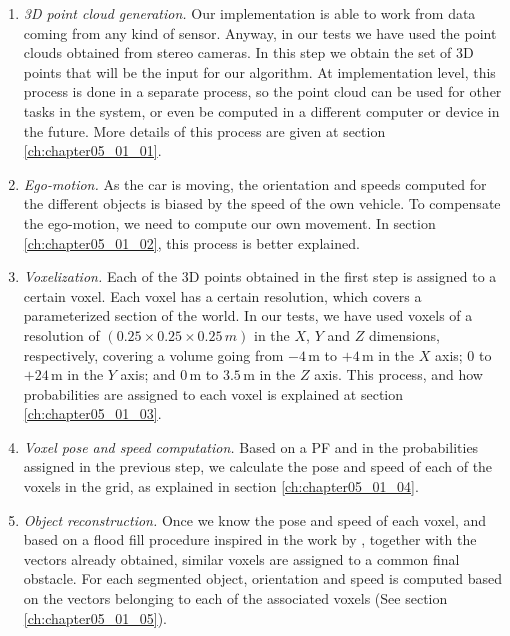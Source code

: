 \begin{enumerate}
 \item \emph{3D point cloud generation.} Our implementation is able to work from data coming from any kind of sensor. Anyway, in our tests we have used the point clouds obtained from stereo cameras. In this step we obtain the set of 3D points that will be the input for our algorithm. At implementation level, this process is done in a separate process, so the point cloud can be used for other tasks in the system, or even be computed in a different computer or device in the future. More details of this process are given at section \ref{ch:chapter05_01_01}.
 \item \emph{Ego-motion.} As the car is moving, the orientation and speeds computed for the different objects is biased by the speed of the own vehicle. To compensate the ego-motion, we need to compute our own movement. In section \ref{ch:chapter05_01_02}, this process is better explained.
 \item \emph{Voxelization.} Each of the 3D points obtained in the first step is assigned to a certain voxel. Each voxel has a certain resolution, which covers a parameterized section of the world. In our tests, we have used voxels of a resolution of $(0.25\times0.25\times0.25\,m)$ in the $X$, $Y$ and $Z$ dimensions, respectively, covering a volume going from $-4$\,m to $+4$\,m in the $X$ axis; $0$ to $+24$\,m in the $Y$ axis; and $0$\,m to $3.5$\,m in the $Z$ axis. This process, and how probabilities are assigned to each voxel is explained at section \ref{ch:chapter05_01_03}.
 \item \emph{Voxel pose and speed computation.} Based on a \ac{PF} and in the probabilities assigned in the previous step, we calculate the pose and speed of each of the voxels in the grid, as explained in section \ref{ch:chapter05_01_04}.
 \item \emph{Object reconstruction.} Once we know the pose and speed of each voxel, and based on a flood fill procedure inspired in the work by \cite{broggi2013}, together with the vectors already obtained, similar voxels are assigned to a common final obstacle. For each segmented object, orientation and speed is computed based on the vectors belonging to each of the associated voxels (See section \ref{ch:chapter05_01_05}).
\end{enumerate}

